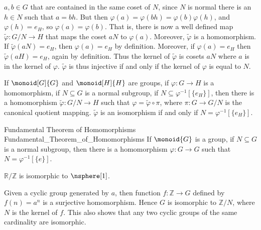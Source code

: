 \documentclass{article}                                                        %
\begin{document}
                $a,b\in{G}$ that are contained in the same coset of $N$, since
                $N$ is normal there is an $h\in{N}$ such that $a=bh$. But then
                $\varphi(a)=\varphi(bh)=\varphi(b)\varphi(h)$, and
                $\varphi(h)=e_{H}$, so $\varphi(a)=\varphi(b)$. That is, there
                is now a well defined map $\tilde{\varphi}:G/N\rightarrow{H}$
                that maps the coset $aN$ to $\varphi(a)$. Moreover,
                $\tilde{\varphi}$ is a homomorphism. If
                $\tilde{\varphi}(aN)=e_{H}$, then $\varphi(a)=e_{H}$ by
                definition. Moreover, if $\varphi(a)=e_{H}$ then
                $\tilde{\varphi}(aH)=e_{H}$, again by definition. Thus the
                kernel of $\tilde{\varphi}$ is cosets $aN$ where $a$ is in the
                kernel of $\varphi$. $\tilde{\varphi}$ is thus injective if and
                only if the kernel of $\varphi$ is equal to $N$.
                \begin{theorem}
                    If $\monoid[G]{G}$ and $\monoid[H]{H}$ are groups, if
                    $\varphi:G\rightarrow{H}$ is a homomorphism, if
                    $N\subseteq{G}$ is a normal subgroup, if
                    $N\subseteq\varphi^{\minus{1}}[\{e_{H}\}]$, then there is a
                    homomorphism $\tilde{\varphi}:G/N\rightarrow{H}$ such that
                    $\varphi=\tilde{\varphi}\circ\pi$, where
                    $\pi:G\rightarrow{G}/N$ is the canonical quotient mapping.
                    $\tilde{\varphi}$ is an isomorphism if and only if
                    $N=\varphi^{\minus{1}}[\{e_{H}\}]$.
                \end{theorem}
                \begin{ftheorem}{Fundamental Theorem of Homomorphisms}
                                {Fundamental_Theorem_of_Homomorphisms}
                    If $\monoid{G}$ is a group, if $N\subseteq{G}$ is a normal
                    subgroup, then there is a homomorphism
                    $\varphi:G\rightarrow{G}$ such that
                    $N=\varphi^{\minus{1}}[\{e\}]$.
                \end{ftheorem}
                \begin{example}
                    $\mathbb{R}/\mathbb{Z}$ is isomorphic to $\nsphere[1]$.
                \end{example}
                \begin{example}
                    Given a cyclic group generated by $a$, then function
                    $f:\mathbb{Z}\rightarrow{G}$ defined by $f(n)=a^{n}$ is a
                    surjective homomorphism. Hence $G$ is isomorphic to
                    $\mathbb{Z}/N$, where $N$ is the kernel of $f$. This also
                    shows that any two cyclic groups of the same cardinality
                    are isomorphic.
                \end{example}
\end{document}
